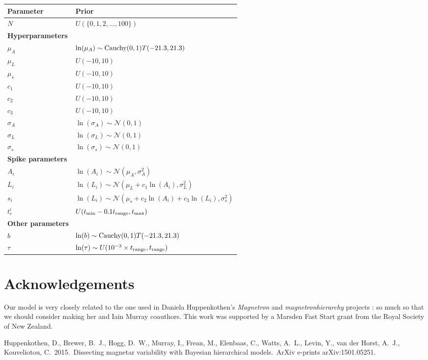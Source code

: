 \documentclass[a4paper, 11pt]{article}
\begin{document}
\begin{table}[!ht]
\begin{center}
\begin{tabular}{|l|l|}
\hline
Parameter			&		Prior\\
\hline
$N$					&		$U(\{0, 1, 2, ..., 100\})$\\
\hline
{\bf Hyperparameters}	&	\\
\hline
$\mu_A$				&		$\ln(\mu_A)\sim\textnormal{Cauchy}(0, 1)T(-21.3, 21.3)$\\
$\mu_L$				&		$U(-10, 10)$\\
$\mu_s$				&		$U(-10, 10)$\\
$c_1$				&		$U(-10, 10)$\\
$c_2$				&		$U(-10, 10)$\\
$c_3$				&		$U(-10, 10)$\\
$\sigma_A$			&		$\ln(\sigma_A) \sim \mathcal{N}(0, 1)$\\
$\sigma_L$			&		$\ln(\sigma_L) \sim \mathcal{N}(0, 1)$\\
$\sigma_s$			&		$\ln(\sigma_s) \sim \mathcal{N}(0, 1)$\\
\hline
{\bf Spike parameters}	&	\\
\hline
$A_i$				&	$\ln(A_i)\sim\mathcal{N}\left(\mu_A, \sigma_A^2\right)$\\
$L_i$				&	$\ln(L_i)\sim\mathcal{N}\left(\mu_L + c_1\ln(A_i), \sigma_L^2\right)$	\\
$s_i$				&	$\ln(L_i)\sim\mathcal{N}\left(\mu_s + c_2\ln(A_i) + c_3\ln(L_i), \sigma_s^2\right)$\\
$t_c^i$				&	$U(t_{\rm min} - 0.1t_{\rm range}, t_{\rm max})$\\
\hline
{\bf Other parameters}	&	\\
\hline
$b$					&	$\ln(b)\sim\textnormal{Cauchy}(0, 1)T(-21.3, 21.3)$\\
$\tau$				&	$\ln(\tau)\sim U(10^{-3}\times t_{\rm range}, t_{\rm range})$\\
\hline
\end{tabular}
\end{center}
\end{table}

\section*{Acknowledgements}
Our model is very closely related to the one used in Daniela Huppenkothen's
{\it Magnetron} and {\it magnetronhierarchy} projects \citep{magnetron}: so
much so that we should consider making her and Iain Murray coauthors.
This work was supported by a Marsden Fast Start grant from the Royal Society of
New Zealand.

\begin{thebibliography}{}
 Huppenkothen, D., 
Brewer, B.~J., Hogg, D.~W., Murray, I., Frean, M., Elenbaas, C., Watts, 
A.~L., Levin, Y., van der Horst, A.~J., Kouveliotou, C.\ 2015.\ Dissecting 
magnetar variability with Bayesian hierarchical models.\ ArXiv e-prints 
arXiv:1501.05251.
\end{thebibliography}
\end{document}
